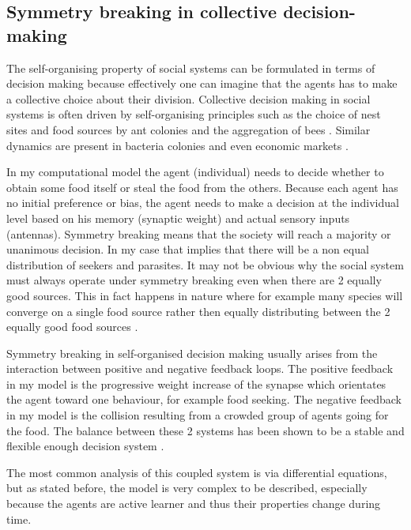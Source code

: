 \subsection{Symmetry breaking in collective decision-making}

The self-organising property of social systems can be formulated
in terms of decision making because effectively one can imagine
that the agents has to make a collective choice about their division.
Collective decision making in social systems is often driven
by self-organising principles such as the choice of nest sites and food sources
by ant colonies and the aggregation of bees
\citep{Franks2003:StrategiesAnts,Dussutour2009:NoiseDecisionAnts,Meyer2008:noise-induced,
 Kornienko2009:ReembodimentOfHoneybee}.
Similar dynamics are present in bacteria colonies \citep{Reading2006:quorumbacteria} and even economic
markets \citep{Gerard2000:HitsFlopsDynamic}.

In my computational model the agent (individual) needs to decide whether to
obtain some food itself or steal the food from the others.
Because each agent has no initial preference or bias,
the agent needs to make a decision at the individual level
based on his memory (synaptic weight) and actual
sensory inputs (antennas).
Symmetry breaking means that the society will reach a majority
or unanimous decision.
In my case that implies that there will be a non equal distribution
of seekers and parasites.
It may not be obvious why the social system must always operate under symmetry breaking
even when there are 2 equally good sources.
This in fact happens in nature where for example many species
will converge on a single food source rather then equally distributing
between the 2 equally good food sources  \citep{Camazine2001:SelfOrgBiological}.

Symmetry breaking in self-organised decision making usually
arises from the interaction between positive and negative feedback loops.
The positive feedback in my model is the progressive weight increase
of the synapse which orientates the agent toward one behaviour,
for example food seeking.
The negative feedback in my model is the collision resulting from
a crowded group of agents going for the food.
The balance between these 2 systems has been shown to be a stable
and flexible enough decision system \citep{Dussutour2009:NoiseDecisionAnts,Meyer2008:noise-induced}.

The most common analysis of this coupled system is via differential equations,
but as stated before, the model is very complex to be described, especially
because the agents are active learner and thus their properties change
during time.


